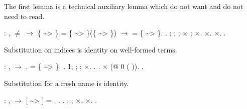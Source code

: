\documentclass[12pt]{report}
\begin{document}
 The first lemma is a technical auxiliary lemma which do not 
    want and do not need to read. \begin{coqdoccode}
\coqdocemptyline
\coqdocnoindent
{}  :\coqdockw{\ensuremath{\forall}}     ,  \ensuremath{\not=}  \ensuremath{\rightarrow}\coqdoceol
\coqdocindent{1.00em}
\{ \~{}> \} = \{ \~{}> \}(\{ \~{}> \}) \ensuremath{\rightarrow}  = \{ \~{}> \}.\coqdoceol
\coqdocnoindent
{}.\coqdoceol
\coqdocindent{1.00em}
 ;   ; ; \ensuremath{\times} ; \ensuremath{\times}.\coqdoceol
\coqdocindent{1.00em}
\ensuremath{\times}. \ensuremath{\times}.\coqdoceol
\coqdocnoindent
{}.\coqdoceol
\coqdocemptyline
\end{coqdoccode}
Substitution on indices is identity on well-formed terms. \begin{coqdoccode}
\coqdocemptyline
\coqdocnoindent
{}  : \coqdockw{\ensuremath{\forall}}  ,\coqdoceol
\coqdocindent{1.00em}
  \ensuremath{\rightarrow} \coqdockw{\ensuremath{\forall}} ,  = \{ \~{}> \}.\coqdoceol
\coqdocnoindent
{}.\coqdoceol
\coqdocindent{1.00em}
 1; ; ; \ensuremath{\times}.  .\coqdoceol
\coqdocindent{1.00em}
 . \ensuremath{\times} (@  0 ( )).\coqdoceol
\coqdocnoindent
{}.\coqdoceol
\coqdocemptyline
\end{coqdoccode}
Substitution for a fresh name is identity. \begin{coqdoccode}
\coqdocemptyline
\coqdocnoindent
{}  : \coqdockw{\ensuremath{\forall}}   , \coqdoceol
\coqdocindent{1.00em}
    \ensuremath{\rightarrow}  [ \~{}> ]  = .\coqdoceol
\coqdocnoindent
{}. .  ; ; \ensuremath{\times}. \ensuremath{\times}. .\coqdoceol
\coqdocemptyline
\end{coqdoccode}
\end{document}
